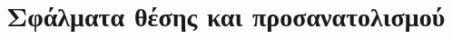 \section{Σφάλματα θέσης και προσανατολισμού}
  \label{appendix:03:location_and_orientation_errors}
  
